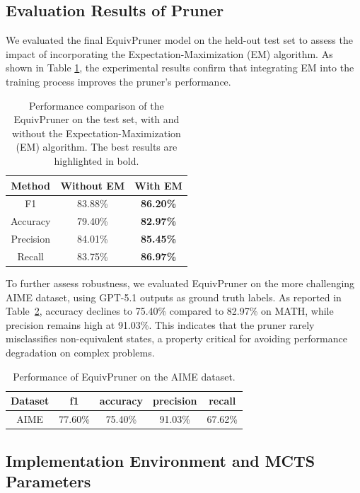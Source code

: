 \documentclass[11pt]{article}
\begin{document}
\subsection{Evaluation Results of Pruner}
\label{eval}
We evaluated the final EquivPruner model on the held-out test set to assess the impact of incorporating the Expectation-Maximization (EM) algorithm. As shown in Table \ref{tab:em}, the experimental results confirm that integrating EM into the training process improves the pruner's performance.
\begin{table}[h]
\centering
\caption{Performance comparison of the EquivPruner on the test set, with and without the Expectation-Maximization (EM) algorithm. The best results are highlighted in bold.}
\label{tab:em}
\begin{tabular}{ccc}
\hline
Method    & Without EM & With EM          \\ \hline
F1        & 83.88\%    & \textbf{86.20\%} \\
Accuracy  & 79.40\%    & \textbf{82.97\%} \\
Precision & 84.01\%    & \textbf{85.45\%} \\
Recall    & 83.75\%    & \textbf{86.97\%} \\ \hline
\end{tabular}
\end{table}

To further assess robustness, we evaluated EquivPruner on the more challenging AIME dataset, using GPT-5.1 outputs as ground truth labels. As reported in Table~\ref{tab:aimea}, accuracy declines to 75.40\% compared to 82.97\% on MATH, while precision remains high at 91.03\%. This indicates that the pruner rarely misclassifies non-equivalent states, a property critical for avoiding performance degradation on complex problems.

\begin{table}[h]
\centering
\caption{Performance of EquivPruner on the AIME dataset.}
\label{tab:aimea}
\begin{tabular}{ccccc}
\hline
\small
Dataset & f1      & accuracy & precision & recall                                                 \\ \hline
AIME    & 77.60\% & 75.40\%  & 91.03\%   & 67.62\% \\ \hline
\end{tabular}
\end{table}
\subsection{Implementation Environment and MCTS Parameters}
\label{app:Implementation_Environment}
\end{document}
